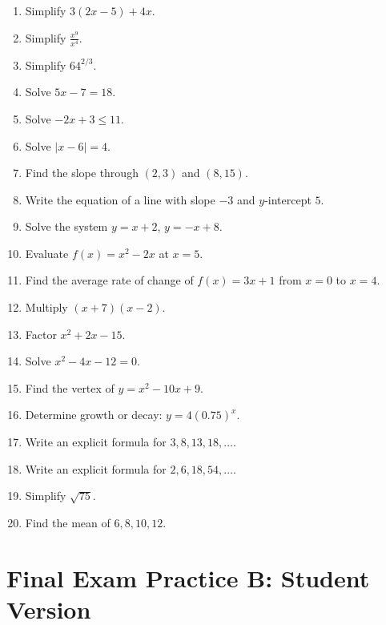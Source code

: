 \documentclass[11pt]{book}
\begin{document}
\begin{enumerate}
\item Simplify \(3(2x-5)+4x\).
\item Simplify \(\frac{x^9}{x^4}\).
\item Simplify \(64^{2/3}\).
\item Solve \(5x-7=18\).
\item Solve \(-2x+3\le11\).
\item Solve \(|x-6|=4\).
\item Find the slope through \((2,3)\) and \((8,15)\).
\item Write the equation of a line with slope \(-3\) and \(y\)-intercept \(5\).
\item Solve the system \(y=x+2\), \(y=-x+8\).
\item Evaluate \(f(x)=x^2-2x\) at \(x=5\).
\item Find the average rate of change of \(f(x)=3x+1\) from \(x=0\) to \(x=4\).
\item Multiply \((x+7)(x-2)\).
\item Factor \(x^2+2x-15\).
\item Solve \(x^2-4x-12=0\).
\item Find the vertex of \(y=x^2-10x+9\).
\item Determine growth or decay: \(y=4(0.75)^x\).
\item Write an explicit formula for \(3,8,13,18,\ldots\).
\item Write an explicit formula for \(2,6,18,54,\ldots\).
\item Simplify \(\sqrt{75}\).
\item Find the mean of \(6,8,10,12\).
\end{enumerate}

\section{Final Exam Practice B: Student Version}
\end{document}
